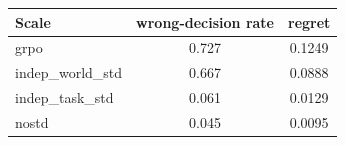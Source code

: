 \begin{tabular}{lcc}
\toprule
Scale & wrong-decision rate & regret\\
\midrule
grpo & 0.727 & 0.1249 \\
indep\_world\_std & 0.667 & 0.0888 \\
indep\_task\_std & 0.061 & 0.0129 \\
nostd & 0.045 & 0.0095 \\
\bottomrule
\end{tabular}
